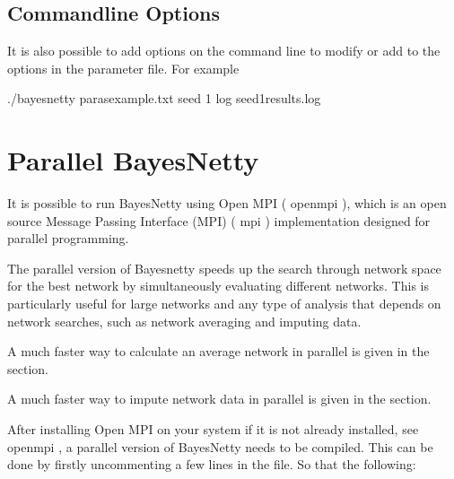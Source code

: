 \documentclass[letterpaper,10pt,english]{sphinxmanual}
\begin{document}
\subsection{Command\sphinxhyphen{}line Options}
\label{\detokenize{using:command-line-options}}\label{\detokenize{using:command-line}}
\sphinxAtStartPar
It is also possible to add options on the command line to modify or add to the options in the parameter file. For example

\begin{sphinxVerbatim}[commandchars=\\\{\}]
./bayesnetty paras\PYGZhy{}example.txt \PYGZhy{}seed 1 \PYGZhy{}log seed\PYGZhy{}1\PYGZhy{}results.log
\end{sphinxVerbatim}

\sphinxstepscope


\section{Parallel BayesNetty}
\label{\detokenize{parallel:parallel-bayesnetty}}\label{\detokenize{parallel:parallel}}\label{\detokenize{parallel::doc}}
\sphinxAtStartPar
It is possible to run BayesNetty using Open MPI ( openmpi ), which is an open source Message Passing Interface (MPI) ( mpi ) implementation designed for parallel programming.

\sphinxAtStartPar
The parallel version of Bayesnetty speeds up the search through network space for the best network by simultaneously evaluating different networks. This is particularly useful for large networks and any type of analysis that depends on network searches, such as network averaging and imputing data.

\sphinxAtStartPar
A much faster way to calculate an average network in parallel is given in the  section.

\sphinxAtStartPar
A much faster way to impute network data in parallel is given in the  section.

\sphinxAtStartPar
After installing Open MPI on your system if it is not already installed, see  openmpi , a parallel version of BayesNetty needs to be compiled. This can be done by firstly uncommenting a few lines in the  file. So that the following:
\end{document}
